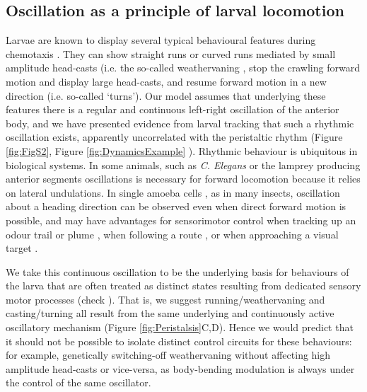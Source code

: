 \documentclass[11pt,a4paper]{article}
\newcommand{\todoKL}[1]{\todo[author=KL,color=blue!40, size=\tiny,inline]{#1}}
\newcommand{\todoBW}[1]{\todo[author=BW,color=orange, size=\tiny,inline]{#1}}
\begin{document}
\subsection{Oscillation as a principle of larval locomotion}
Larvae are known to display several typical behavioural features during chemotaxis \citep{green1983organization,cobbwhatandhow1999,gomez2012active}.
 They can show straight runs or curved runs mediated by small amplitude head-casts (i.e. the so-called weathervaning \citep{iino2009parallel,ohashi2014novel,gomez2014multilevel}, stop the crawling forward motion and display large head-casts, and resume forward motion in a new direction (i.e. so-called ‘turns’).
 Our model assumes that underlying these features there is a regular and continuous left-right oscillation of the anterior body, and we have presented evidence from larval tracking that such a rhythmic oscillation exists, apparently uncorrelated with the peristaltic rhythm (Figure \ref{fig:FigS2}, Figure \ref{fig:DynamicsExample}  ).
 Rhythmic behaviour is ubiquitous in biological systems. In some animals, such as {\it C. Elegans} \citep{iino2009parallel,izquierdo2010evolution,lockery2011computational}  or the lamprey  \citep{lansner1997realistic,wilson1999spikes} producing anterior segments oscillations is necessary for forward locomotion because it relies on lateral undulations.
 In single amoeba cells \citep{yangzigzag2011}, as in many insects, oscillation about a heading direction can be observed \citep{farkas1972chemical} even when direct forward motion is possible, and may have advantages for sensorimotor control when tracking up an odour trail 
  or plume \citep{budick2006free,belanger1996centrally,willis1997centrally,willis2008effects,carde2008navigational}  , when following a route \citep{lent2010image,kodzhabashev2015route}, or when approaching a visual target \citep{wallace1962experiments,philippides2013bumblebee,voss1998active}.

We take this continuous oscillation to be the underlying basis for behaviours of the larva that are often treated as distinct states resulting from dedicated sensory motor processes (check \cite{vogelstein2014discovery, green1983organization, cobbwhatandhow1999, gomez2012active, gomez2014multilevel, hernandez2015reverse,gepner2015computations}).
 That is, we suggest running/weathervaning and casting/turning all result from the same underlying and continuously active oscillatory mechanism (Figure \ref{fig:Peristalsis}C,D).
  Hence we would predict that it should not be possible to isolate distinct control circuits for these behaviours: for example, genetically switching-off weathervaning without affecting high amplitude head-casts or vice-versa, as body-bending modulation is always under the control of the same oscillator. 
\end{document}

